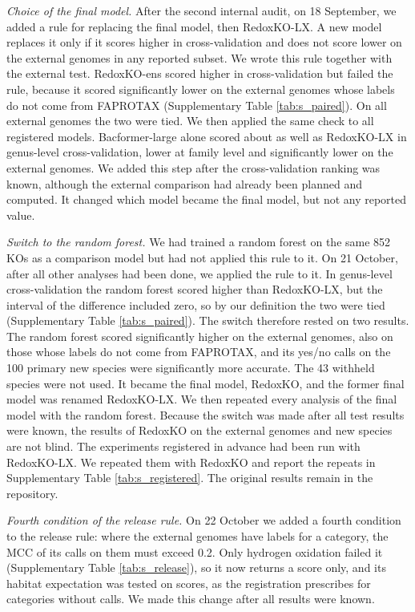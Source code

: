 \documentclass[10pt,a4paper,onecolumn]{article}
\begin{document}
{\emph{Choice of the final model.} After the second internal audit, on 18
September, we added a rule for replacing the final model, then
RedoxKO-LX. A new model replaces it only if it scores higher in
cross-validation and does not score lower on the external genomes in any
reported subset. We wrote this rule together with the external test.
RedoxKO-ens scored higher in cross-validation but failed the rule,
because it scored significantly lower on the external genomes whose
labels do not come from FAPROTAX (Supplementary Table
\ref{tab:s_paired}). On all external genomes the two were tied. We then
applied the same check to all registered models. Bacformer-large alone
scored about as well as RedoxKO-LX in genus-level cross-validation,
lower at family level and significantly lower on the external genomes.
We added this step after the cross-validation ranking was known,
although the external comparison had already been planned and computed.
It changed which model became the final model, but not any reported
value.

\emph{Switch to the random forest.} We had trained a random forest on
the same 852 KOs as a comparison model but had not applied this rule to
it. On 21 October, after all other analyses had been done, we applied
the rule to it. In genus-level cross-validation the random forest scored
higher than RedoxKO-LX, but the interval of the difference included
zero, so by our definition the two were tied (Supplementary Table
\ref{tab:s_paired}). The switch therefore rested on two results. The
random forest scored significantly higher on the external genomes, also
on those whose labels do not come from FAPROTAX, and its yes/no calls on
the 100 primary new species were significantly more accurate. The 43
withheld species were not used. It became the final model, RedoxKO, and
the former final model was renamed RedoxKO-LX. We then repeated every
analysis of the final model with the random forest. Because the switch
was made after all test results were known, the results of RedoxKO on
the external genomes and new species are not blind. The experiments
registered in advance had been run with RedoxKO-LX. We repeated them
with RedoxKO and report the repeats in Supplementary Table
\ref{tab:s_registered}. The original results remain in the repository.

\emph{Fourth condition of the release rule.} On 22 October we added a
fourth condition to the release rule: where the external genomes have
labels for a category, the MCC of its calls on them must exceed 0.2.
Only hydrogen oxidation failed it (Supplementary Table
\ref{tab:s_release}), so it now returns a score only, and its habitat
expectation was tested on scores, as the registration prescribes for
categories without calls. We made this change after all results were
known.

}
\end{document}
